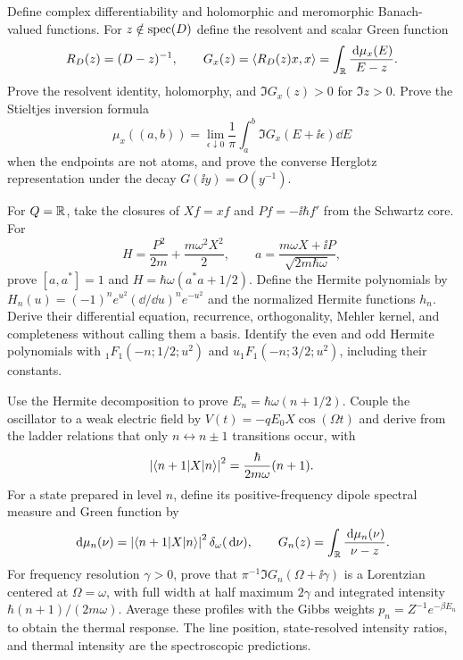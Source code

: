 \begin{exercise}
Define complex differentiability and holomorphic and meromorphic
Banach-valued functions.  For $z\notin\operatorname{spec}(D)$ define the resolvent and
scalar Green function
\[
 R_D(z)=(D-z)^{-1},\qquad
 G_x(z)=\left\langle R_D(z)x,x\right\rangle
       =\int_\mathbb R\frac{\,\mathrm d\mu_x(E)}{E-z}.
\]
Prove the resolvent identity, holomorphy, and
$\Im G_x(z)>0$ for $\Im z>0$.  Prove the Stieltjes inversion formula
\[
 \mu_x((a,b))=\lim_{\epsilon\downarrow0}
 \frac1\pi\int_a^b\Im G_x(E+\ii\epsilon)\dd E
\]
when the endpoints are not atoms, and prove the converse Herglotz
representation under the decay $G(\ii y)=O(y^{-1})$.
\end{exercise}

\begin{exercise}
For $Q=\mathbb R$, take the closures of
$Xf=xf$ and $Pf=-\ii\hbar f'$ from the Schwartz core.  For
\[
 H=\frac{P^2}{2m}+\frac{m\omega^2X^2}{2},\qquad
 a=\frac{m\omega X+\ii P}{\sqrt{2m\hbar\omega}},
\]
prove $[a,a^*]=1$ and $H=\hbar\omega(a^*a+1/2)$.  Define the Hermite
polynomials by
$H_n(u)=(-1)^ne^{u^2}(\dd/\dd u)^ne^{-u^2}$ and the normalized Hermite
functions $h_n$.  Derive their differential equation, recurrence,
orthogonality, Mehler kernel, and completeness without calling them a basis.
Identify the even and odd Hermite polynomials with
${}_1F_1(-n;1/2;u^2)$ and $u{}_1F_1(-n;3/2;u^2)$, including their constants.
\end{exercise}

\begin{exercise}
Use the Hermite decomposition to prove
$E_n=\hbar\omega(n+1/2)$.  Couple the oscillator to a weak electric field by
$V(t)=-qE_0X\cos(\Omega t)$ and derive from the ladder relations that only
$n\leftrightarrow n\pm1$ transitions occur, with
\[
 \left\lvert \langle n+1|X|n\rangle\right\rvert^2
 =\frac{\hbar}{2m\omega}(n+1).
\]
For a state prepared in level $n$, define its positive-frequency dipole
spectral measure and Green function by
\[
 \,\mathrm d\mu_n(\nu)=\left\lvert \langle n+1|X|n\rangle\right\rvert^2\delta_\omega(\,\mathrm d\nu),
 \qquad G_n(z)=\int_\mathbb R\frac{\,\mathrm d\mu_n(\nu)}{\nu-z}.
\]
For frequency resolution $\gamma>0$, prove that
$\pi^{-1}\Im G_n(\Omega+\ii\gamma)$ is a Lorentzian centered at
$\Omega=\omega$, with full width at half maximum $2\gamma$ and integrated
intensity $\hbar(n+1)/(2m\omega)$.  Average these profiles with the Gibbs
weights $p_n=Z^{-1}e^{-\beta E_n}$ to obtain the thermal response.  The line
position, state-resolved intensity ratios, and thermal intensity are the
spectroscopic predictions.
\end{exercise}

